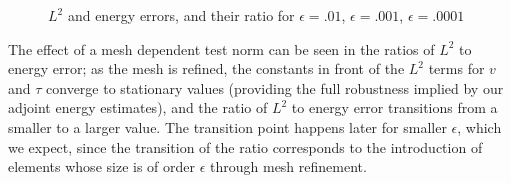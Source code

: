 \documentclass[11pt,onecolumn]{scrartcl}
\begin{document}
\begin{figure}[h!]
\centering
{}
\caption{$L^2$ and energy errors, and their ratio for $\epsilon=.01$, $\epsilon=.001$, $\epsilon=.0001$}
\label{ratios_simple}
\end{figure}
The effect of a mesh dependent test norm can be seen in the ratios of $L^2$ to energy error; as the mesh is refined, the constants in front of the $L^2$ terms for $v$ and $\tau$ converge to stationary values (providing the full robustness implied by our adjoint energy estimates), and the ratio of $L^2$ to energy error transitions from a smaller to a larger value.  The transition point happens later for smaller $\epsilon$, which we expect, since the transition of the ratio corresponds to the introduction of elements whose size is of order $\epsilon$ through mesh refinement. 
\end{document}

